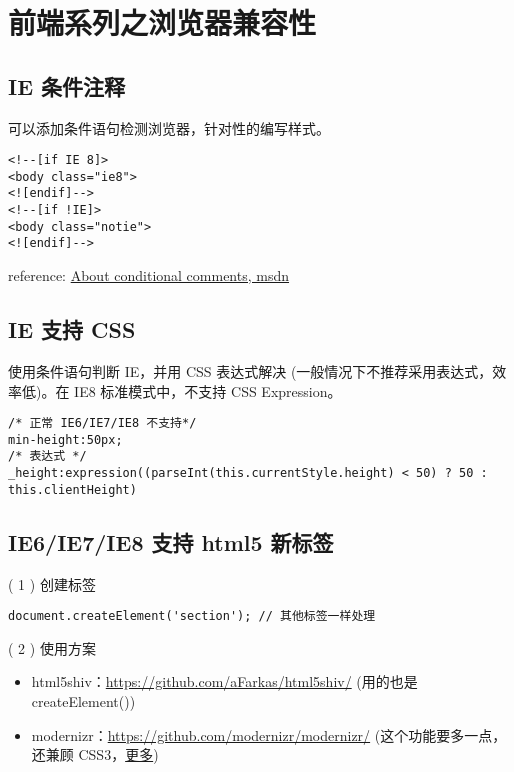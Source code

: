 \section{前端系列之浏览器兼容性}\hypertarget{section}{}\label{section}

\subsection{IE 条件注释}\hypertarget{ie-}{}\label{ie-}

可以添加条件语句检测浏览器，针对性的编写样式。

\begin{verbatim}<!--[if IE 8]>
<body class="ie8">
<![endif]-->
<!--[if !IE]>
<body class="notie">
<![endif]-->
\end{verbatim}

reference: \href{https://msdn.microsoft.com/en-us/library/ms537512(v=vs.85).aspx}{About conditional comments, msdn}

\subsection{IE 支持 CSS}\hypertarget{ie--css}{}\label{ie--css}

使用条件语句判断 IE，并用 CSS 表达式解决 (一般情况下不推荐采用表达式，效率低)。在 IE8 标准模式中，不支持 CSS Expression。

\begin{verbatim}/* 正常 IE6/IE7/IE8 不支持*/
min-height:50px;
/* 表达式 */
_height:expression((parseInt(this.currentStyle.height) < 50) ? 50 : this.clientHeight)
\end{verbatim}

\subsection{IE6/IE7/IE8 支持 html5 新标签}\hypertarget{ie6ie7ie8--html5-}{}\label{ie6ie7ie8--html5-}

( 1 ) 创建标签

\begin{verbatim}document.createElement('section'); // 其他标签一样处理
\end{verbatim}

( 2 ) 使用方案

\begin{itemize}
\item html5shiv：\href{https://github.com/aFarkas/html5shiv/}{https://github.com/aFarkas/html5shiv/} (用的也是 createElement())
\item modernizr：\href{https://github.com/modernizr/modernizr/}{https://github.com/modernizr/modernizr/} (这个功能要多一点，还兼顾 CSS3，\href{http://www.osmn00.com/translation/221.html}{更多})
\end{itemize}

